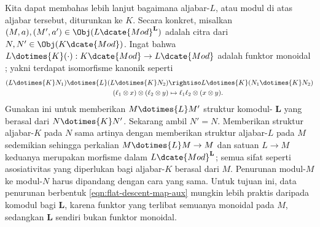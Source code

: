 \begin{remark}\label{rem:flat-descent-alg}
	Kita dapat membahas lebih lanjut bagaimana aljabar-$L$, atau modul di atas
	aljabar tersebut, diturunkan ke $K$. Secara konkret, misalkan
	$(M,a),(M',a')\in\Obj(L\dcate{Mod}^{\mathbf{L}})$ adalah citra dari
	$N,N'\in\Obj(K\dcate{Mod})$. Ingat bahwa
	$L\dotimes{K}(\mathord\cdot):K\dcate{Mod}\to L\dcate{Mod}$ adalah funktor
	monoidal \cite[Proposisi 6.6.10]{Li1}; yakni terdapat isomorfisme kanonik
	seperti
	\begin{equation}\label{eqn:change-of-ring-monoidal}\begin{aligned}
			(L \dotimes{K} N_1) \dotimes{L} (L \dotimes{K} N_2) & \rightiso L \dotimes{K} (N_1 \dotimes{K} N_2) \\
			(\ell_1 \otimes x) \otimes (\ell_2 \otimes y) & \mapsto \ell_1 \ell_2 \otimes (x \otimes y).
	\end{aligned}\end{equation}
	Gunakan ini untuk memberikan $M\dotimes{L}M'$ struktur komodul-
	$\mathbf{L}$ yang berasal dari $N\dotimes{K}N'$. Sekarang ambil $N'=N$.
	Memberikan struktur aljabar-$K$ pada $N$ sama artinya dengan memberikan
	struktur aljabar-$L$ pada $M$ sedemikian sehingga perkalian
	$M\dotimes{L}M\to M$ dan satuan $L\to M$ keduanya merupakan morfisme dalam
	$L\dcate{Mod}^{\mathbf{L}}$; semua sifat seperti asosiativitas yang
	diperlukan bagi aljabar-$K$ berasal dari $M$. Penurunan modul-$M$ ke
	modul-$N$ harus dipandang dengan cara yang sama. Untuk tujuan ini, data
	penurunan berbentuk \eqref{eqn:flat-descent-map-aux} mungkin lebih praktis
	daripada komodul bagi $\mathbf{L}$, karena funktor yang terlibat semuanya
	monoidal pada $M$, sedangkan $\mathbf{L}$ sendiri bukan funktor monoidal.
\end{remark}
